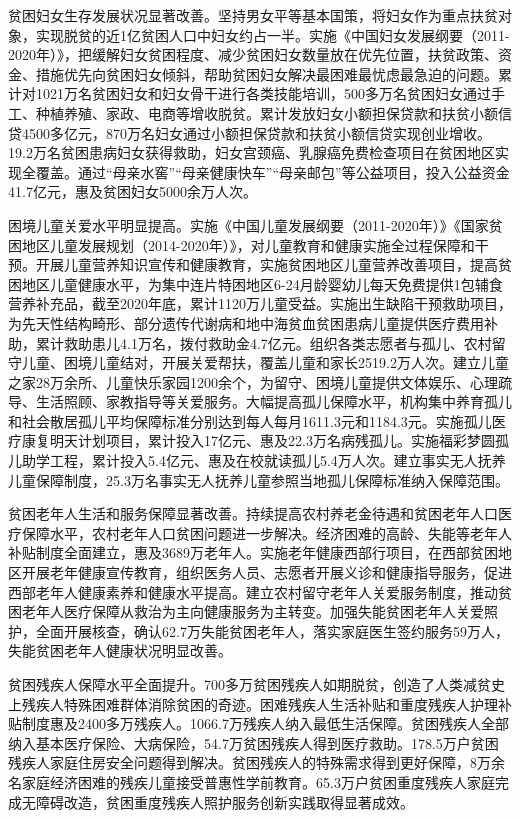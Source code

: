 \documentclass{ctexart}
\begin{document}
贫困妇女生存发展状况显著改善。坚持男女平等基本国策，将妇女作为重点扶贫对象，实现脱贫的近1亿贫困人口中妇女约占一半。实施《中国妇女发展纲要（2011-2020年）》，把缓解妇女贫困程度、减少贫困妇女数量放在优先位置，扶贫政策、资金、措施优先向贫困妇女倾斜，帮助贫困妇女解决最困难最忧虑最急迫的问题。累计对1021万名贫困妇女和妇女骨干进行各类技能培训，500多万名贫困妇女通过手工、种植养殖、家政、电商等增收脱贫。累计发放妇女小额担保贷款和扶贫小额信贷4500多亿元，870万名妇女通过小额担保贷款和扶贫小额信贷实现创业增收。19.2万名贫困患病妇女获得救助，妇女宫颈癌、乳腺癌免费检查项目在贫困地区实现全覆盖。通过“母亲水窖”“母亲健康快车”“母亲邮包”等公益项目，投入公益资金41.7亿元，惠及贫困妇女5000余万人次。

困境儿童关爱水平明显提高。实施《中国儿童发展纲要（2011-2020年）》《国家贫困地区儿童发展规划（2014-2020年）》，对儿童教育和健康实施全过程保障和干预。开展儿童营养知识宣传和健康教育，实施贫困地区儿童营养改善项目，提高贫困地区儿童健康水平，为集中连片特困地区6-24月龄婴幼儿每天免费提供1包辅食营养补充品，截至2020年底，累计1120万儿童受益。实施出生缺陷干预救助项目，为先天性结构畸形、部分遗传代谢病和地中海贫血贫困患病儿童提供医疗费用补助，累计救助患儿4.1万名，拨付救助金4.7亿元。组织各类志愿者与孤儿、农村留守儿童、困境儿童结对，开展关爱帮扶，覆盖儿童和家长2519.2万人次。建立儿童之家28万余所、儿童快乐家园1200余个，为留守、困境儿童提供文体娱乐、心理疏导、生活照顾、家教指导等关爱服务。大幅提高孤儿保障水平，机构集中养育孤儿和社会散居孤儿平均保障标准分别达到每人每月1611.3元和1184.3元。实施孤儿医疗康复明天计划项目，累计投入17亿元、惠及22.3万名病残孤儿。实施福彩梦圆孤儿助学工程，累计投入5.4亿元、惠及在校就读孤儿5.4万人次。建立事实无人抚养儿童保障制度，25.3万名事实无人抚养儿童参照当地孤儿保障标准纳入保障范围。

贫困老年人生活和服务保障显著改善。持续提高农村养老金待遇和贫困老年人口医疗保障水平，农村老年人口贫困问题进一步解决。经济困难的高龄、失能等老年人补贴制度全面建立，惠及3689万老年人。实施老年健康西部行项目，在西部贫困地区开展老年健康宣传教育，组织医务人员、志愿者开展义诊和健康指导服务，促进西部老年人健康素养和健康水平提高。建立农村留守老年人关爱服务制度，推动贫困老年人医疗保障从救治为主向健康服务为主转变。加强失能贫困老年人关爱照护，全面开展核查，确认62.7万失能贫困老年人，落实家庭医生签约服务59万人，失能贫困老年人健康状况明显改善。

贫困残疾人保障水平全面提升。700多万贫困残疾人如期脱贫，创造了人类减贫史上残疾人特殊困难群体消除贫困的奇迹。困难残疾人生活补贴和重度残疾人护理补贴制度惠及2400多万残疾人。1066.7万残疾人纳入最低生活保障。贫困残疾人全部纳入基本医疗保险、大病保险，54.7万贫困残疾人得到医疗救助。178.5万户贫困残疾人家庭住房安全问题得到解决。贫困残疾人的特殊需求得到更好保障，8万余名家庭经济困难的残疾儿童接受普惠性学前教育。65.3万户贫困重度残疾人家庭完成无障碍改造，贫困重度残疾人照护服务创新实践取得显著成效。
\end{document}
